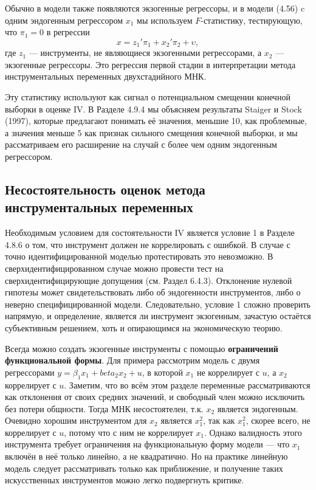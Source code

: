 Обычно в модели также появляются экзогенные регрессоры, и в модели (4.56) c одним эндогенным регрессором $x_1$ мы используем $F$-статистику, тестирующую, что $\pi_1=0$ в регрессии 
\begin{equation}
x = z_1'\pi_1 + x_2'\pi_2+\upsilon,
\end{equation}
где $z_1$ --- инструменты, не являющиеся экзогенными регрессорами, а $x_2$ --- экзогенные регрессоры. Это регрессия первой стадии в интерпретации метода инструментальных переменных двухстадийного МНК.

Эту статистику используют как сигнал о потенциальном смещении конечной выборки в оценке IV.  В Разделе 4.9.4 мы объясняем результаты Staiger и Stock (1997), которые предлагают понимать её значения, меньшие 10, как проблемные, а значения меньше 5 как признак сильного смещения конечной выборки, и мы рассматриваем его расширение на случай с более чем одним эндогенным регрессором.

\subsection{Несостоятельность оценок метода инструментальных переменных}

Необходимым условием для состоятельности IV является условие 1 в Разделе 4.8.6 о том, что инструмент должен не коррелировать с ошибкой. В случае с точно идентифицированной моделью протестировать это невозможно. В сверхидентифицированном случае можно провести тест на сверхидентифицирующие допущения (см. Раздел 6.4.3). Отклонение нулевой гипотезы может свидетельствовать либо об эндогенности инструментов, либо о неверно специфицированной модели. Следовательно, условие 1 сложно проверить напрямую, и определение, является ли инструмент экзогенным, зачастую остаётся субъективным решением, хоть и опирающимся на экономическую теорию.

Всегда можно создать экзогенные инструменты с помощью \textbf{ограничений функциональной формы}. Для примера рассмотрим модель с двумя регрессорами $y = \beta_1 x_1 +beta_2 x_2 +u$, в которой $x_1$ не коррелирует с $u$, а $x_2$ коррелирует с $u$. Заметим, что во всём этом разделе переменные рассматриваются как отклонения от своих средних значений, и свободный член можно исключить без потери общности. Тогда МНК несостоятелен, т.к. $x_2$ является эндогенным. Очевидно хорошим инструментом для $x_2$ является $x_1^2$, так как $x_1^2$, скорее всего, не коррелирует с $u$, потому что с ним не коррелирует $x_1$. Однако валидность этого инструмента требует ограничения на функциональную форму модели --- что $x_1$ включён в неё только линейно, а не квадратично. Но на практике линейную модель следует рассматривать только как приближение, и получение таких искусственных инструментов можно легко подвергнуть критике.

